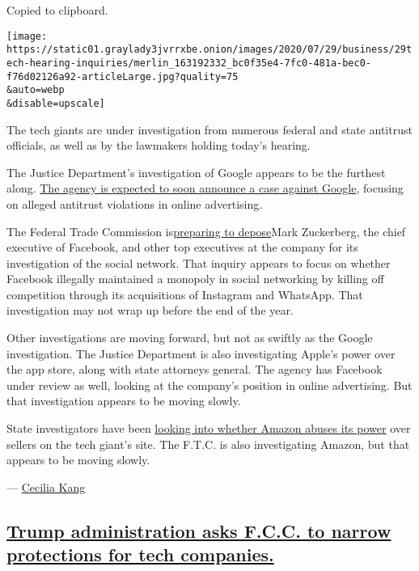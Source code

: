 Copied to clipboard.

\texttt{[image: https://static01.graylady3jvrrxbe.onion/images/2020/07/29/business/29tech-hearing-inquiries/merlin\_163192332\_bc0f35e4-7fc0-481a-bec0-f76d02126a92-articleLarge.jpg?quality=75\\\&auto=webp\\\&disable=upscale]}

The tech giants are under investigation from numerous federal and state
antitrust officials, as well as by the lawmakers holding today's
hearing.

The Justice Department's investigation of Google appears to be the
furthest along.
\href{https://www.nytimes3xbfgragh.onion/2020/06/25/technology/barr-google-investigation.html}{The
agency is expected to soon announce a case against Google}, focusing on
alleged antitrust violations in online advertising.

The Federal Trade Commission
is\href{https://www.nytimes3xbfgragh.onion/2020/07/17/technology/ftc-facebook-investigation.html}{preparing
to depose}Mark Zuckerberg, the chief executive of Facebook, and other
top executives at the company for its investigation of the social
network. That inquiry appears to focus on whether Facebook illegally
maintained a monopoly in social networking by killing off competition
through its acquisitions of Instagram and WhatsApp. That investigation
may not wrap up before the end of the year.

Other investigations are moving forward, but not as swiftly as the
Google investigation. The Justice Department is also investigating
Apple's power over the app store, along with state attorneys general.
The agency has Facebook under review as well, looking at the company's
position in online advertising. But that investigation appears to be
moving slowly.

State investigators have been
\href{https://www.nytimes3xbfgragh.onion/2020/06/12/technology/state-inquiry-antitrust-amazon.html}{looking
into whether Amazon abuses its power} over sellers on the tech giant's
site. The F.T.C. is also investigating Amazon, but that appears to be
moving slowly.

--- \href{https://www.nytimes3xbfgragh.onion/by/cecilia-kang}{Cecilia
Kang}

\hypertarget{trump-administration-asks-fcc-to-narrow-protections-for-tech-companies}{%
\subsection{\texorpdfstring{\protect\hyperlink{trump-administration-asks-fcc-to-narrow-protections-for-tech-companies}{Trump
administration asks F.C.C. to narrow protections for tech
companies.}}{Trump administration asks F.C.C. to narrow protections for tech companies.}}\label{trump-administration-asks-fcc-to-narrow-protections-for-tech-companies}}

